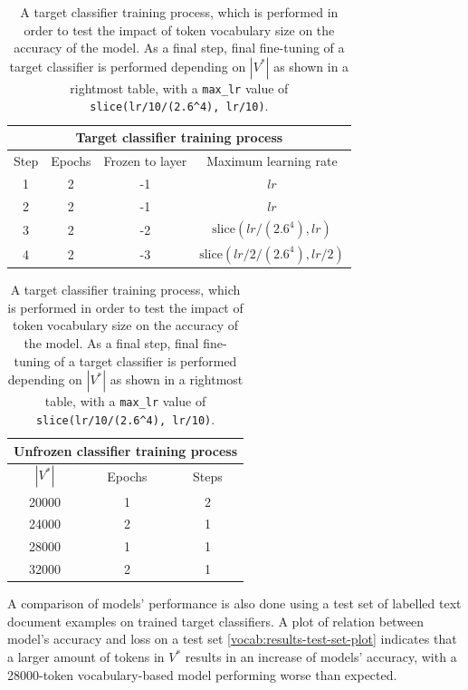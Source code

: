 \begin{table}[!t]
\centering

\begin{tabular}{ cccc }
\toprule
\multicolumn{4}{c}{Target classifier training process} \\ \midrule
Step & Epochs & Frozen to layer & Maximum learning rate \\ \midrule
1 & 2 & -1 & $lr$ \\
2 & 2 & -1 & $lr$ \\
3 & 2 & -2 & $\mathrm{slice}(lr/(2.6^4), lr)$ \\
4 & 2 & -3 & $\mathrm{slice}(lr/2/(2.6^4), lr/2)$ \\
\bottomrule
\end{tabular}
\quad
\centering
\begin{tabular}{ ccc }
\toprule
\multicolumn{3}{c}{Unfrozen classifier training process} \\ \midrule
$|V^*|$ & Epochs & Steps \\ \midrule
20000 & 1 & 2 \\
24000 & 2 & 1 \\
28000 & 1 & 1 \\
32000 & 2 & 1 \\
\bottomrule
\end{tabular}

\caption{A target classifier training process, which is performed in order to test the impact of token vocabulary size on the accuracy of the model. As a final step, final fine-tuning of a target classifier is performed depending on $|V^*|$ as shown in a rightmost table, with a \lstinline{max_lr} value of \lstinline{slice(lr/10/(2.6^4), lr/10)}.}
\label{vocab:class}
\end{table}

A comparison of models' performance is also done using a test set of labelled text document examples on trained target classifiers. A plot of relation between model's accuracy and loss on a test set \ref{vocab:results-test-set-plot} indicates that a larger amount of tokens in $V^*$ results in an increase of models' accuracy, with a 28000-token vocabulary-based model performing worse than expected.

